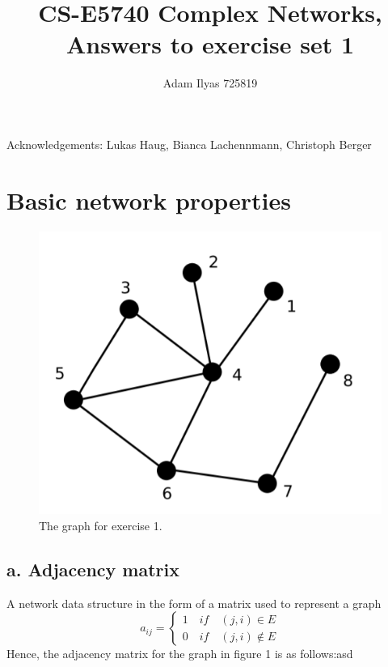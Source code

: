 \documentclass[a4paper,12pt]{article}
\author{Adam Ilyas 725819}
\title{
CS-E5740 Complex Networks, \\
Answers to exercise set 1
}
\begin{document}
\vspace{8pt}

\maketitle

Acknowledgements: Lukas Haug, Bianca Lachennmann, Christoph Berger
\section{Basic network properties}

\begin{figure}[!ht]
	\begin{center}
    \includegraphics[scale=0.33]{graph_ex_1.PNG}
    \caption{The graph for exercise 1.}
	\label{fig:graph1}
	\end{center}
\end{figure}

\subsection*{a. Adjacency matrix}
A network data structure in the form of a matrix used to represent a
graph
\[
  a_{ij}=\begin{cases}
               1 \quad if \quad (j,i) \in E\\
               0 \quad if \quad (j,i) \notin E
            \end{cases}
\]
Hence, the adjacency matrix for the graph in figure 1 is as follows:asd
\end{document}
